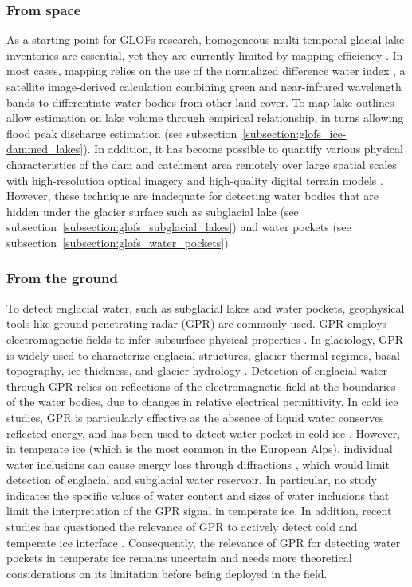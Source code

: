 \subsubsection{From space}

As a starting point for GLOFs research, homogeneous multi-temporal glacial lake inventories are essential, yet they are currently limited by mapping efficiency \citep{Zhang&al2024}. In most cases, mapping relies on the use of the normalized difference water index \citep{McFeeters1996}, a satellite image-derived calculation combining green and near-infrared wavelength bands to differentiate water bodies from other land cover. To map lake outlines allow estimation on lake volume through empirical relationship, in turns allowing flood peak discharge estimation (see subsection~\ref{subsection:glofs_ice-dammed_lakes}). In addition, it has become possible to quantify various physical characteristics of the dam and catchment area remotely over large spatial scales with high-resolution optical imagery and high-quality digital terrain models \citep[e.g.][]{Dubey&al2020,Rounce&al2016}. However, these technique are inadequate for detecting water bodies that are hidden under the glacier surface such as subglacial lake (see subsection~\ref{subsection:glofs_subglacial_lakes}) and water pockets (see subsection~\ref{subsection:glofs_water_pockets}).

\subsubsection{From the ground}


To detect englacial water, such as subglacial lakes and water pockets, geophysical tools like ground-penetrating radar (GPR) are commonly used. GPR employs electromagnetic fields to infer subsurface physical properties \citep{Davis&Annan1989}. In glaciology, GPR is widely used to characterize englacial structures, glacier thermal regimes, basal topography, ice thickness, and glacier hydrology \citep{Woodward&Burke2007,Plewes&Hubbard2001,Navarro&Eisen2009,Schroeder&al2020}. Detection of englacial water through GPR relies on reflections of the electromagnetic field at the boundaries of the water bodies, due to changes in relative electrical permittivity. In cold ice studies, GPR is particularly effective as the absence of liquid water conserves reflected energy, and has been used to detect water pocket in cold ice \citep{Vincent&al2012}. However, in temperate ice (which is the most common in the European Alps), individual water inclusions can cause energy loss through diffractions \citep{Smith&Evans1972,Murray&al2000}, which would limit detection of englacial and subglacial water reservoir. In particular, no study indicates the specific values of water content and sizes of water inclusions that limit the interpretation of the GPR signal in temperate ice. In addition, recent studies has questioned the relevance of GPR to actively detect cold and temperate ice interface \citep[e.g.][]{Brown&al2009}. Consequently, the relevance of GPR for detecting water pockets in temperate ice remains uncertain and needs more theoretical considerations on its limitation before being deployed in the field.

